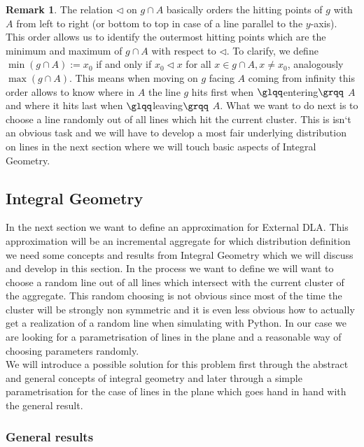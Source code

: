 \documentclass[12pt,a4paper]{scrartcl}
\numberwithin{equation}{subsection}
\newcommand{\1}{\mathbbm{1}}
\numberwithin{equation}{section}
\theoremstyle{definition}
\newtheorem{remark}{Remark}[subsection]
\begin{document}
\begin{remark}
	The relation $\triangleleft$ on $g\cap A$ basically orders the hitting points of $g$ with $A$ from left to right (or bottom to top in case of a line parallel to the $y$-axis). This order allows us to identify the outermost hitting points which are the minimum and maximum of $g\cap A$ with respect to $\triangleleft$. To clarify, we define $\min (g\cap A) := x_0$ if and only if $x_0 \triangleleft x$ for all $x\in g\cap A,x\neq x_0$, analogously $\max(g\cap A)$. This means when moving on $g$ facing $A$ coming from infinity this order allows to know where in $A$ the line $g$ hits first when $\glqq$entering$\grqq$ $A$ and where it hits last when $\glqq$leaving$\grqq$ $A$. What we want to do next is to choose a line randomly out of all lines which hit the current cluster. This is isn`t an obvious task and we will have to develop a most fair underlying distribution on lines in the next section where we will touch basic aspects of Integral Geometry. 
\end{remark}






\subsection{Integral Geometry}

In the next section we want to define an approximation for External DLA. This approximation will be an incremental aggregate for which distribution definition we need some concepts and results from Integral Geometry which we will discuss and develop in this section. In the process we want to define we will want to choose a random line out of all lines which intersect with the current cluster of the aggregate. This random choosing is not obvious since most of the time the cluster will be strongly non symmetric and it is even less obvious how to actually get a realization of a random line when simulating with Python. In our case we are looking for a parametrisation of lines in the plane and a reasonable way of choosing parameters randomly. \\

We will introduce a possible solution for this problem first through the abstract and general concepts of integral geometry and later through a simple parametrisation for the case of lines in the plane which goes hand in hand with the general result.

\subsubsection{General results}
\end{document}
